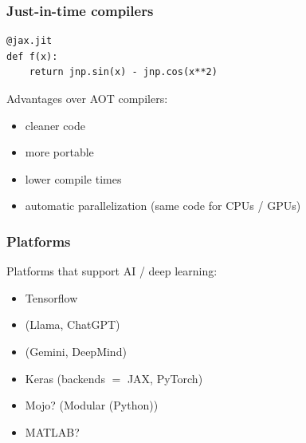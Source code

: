 \begin{frame}[fragile]
    \frametitle{Just-in-time compilers}

    \vspace{0.5em}
    
    \begin{verbatim}
@jax.jit
def f(x):
    return jnp.sin(x) - jnp.cos(x**2)
    \end{verbatim}

    \vspace{0.5em}
    \vspace{0.5em}
    Advantages over AOT compilers:

    \begin{itemize}
        \item cleaner code
    \vspace{0.5em}
        \item more portable
    \vspace{0.5em}
        \item lower compile times
    \vspace{0.5em}
        \item automatic parallelization (same code for CPUs / GPUs)
    \end{itemize}

\end{frame}



\begin{frame}
    \frametitle{Platforms}
    
    Platforms that support AI / deep learning:

    \vspace{0.5em}
    \begin{itemize}
        \item Tensorflow
        \vspace{0.5em}
        \item {} (Llama, ChatGPT)
        \vspace{0.5em}
        \item {} (Gemini, DeepMind)
        \vspace{0.5em}
        \item Keras (backends $=$ JAX, PyTorch)
        \vspace{0.5em}
        \item Mojo? (Modular (Python))
        \vspace{0.5em}
        \item MATLAB? 
    \end{itemize}

\end{frame}




